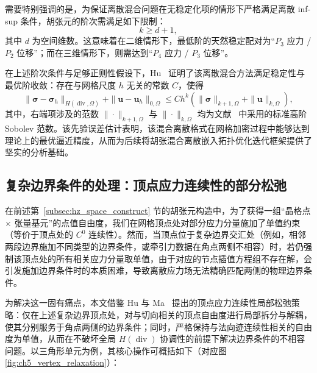 需要特别强调的是，为保证离散混合问题在无稳定化项的情形下严格满足离散 inf-sup 条件，胡张元的阶次需满足如下限制：
\[
k\ge d+1,
\]
其中 $d$ 为空间维数。这意味着在二维情形下，最低阶的天然稳定配对为“$P_3$ 应力 / $P_2$ 位移”；而在三维情形下，则需达到“$P_4$ 应力 / $P_3$ 位移”。

在上述阶次条件与足够正则性假设下，Hu~\cite{huFiniteElementApproximations2015} 证明了该离散混合方法满足稳定性与最优阶收敛：存在与网格尺度 $h$ 无关的常数 $C$，使得
\begin{equation} \label{eq:ch5_hz_error_estimate}
	\|\boldsymbol\sigma - \boldsymbol\sigma_h\|_{H(\operatorname{div},\Omega)} + \|\boldsymbol{u} - \boldsymbol{u}_h\|_{0,\Omega} \le C h^k (\|\boldsymbol\sigma\|_{k+1,\Omega} + \|\boldsymbol{u}\|_{k,\Omega}),
\end{equation}
其中，右端项涉及的范数 $\|\cdot\|_{k+1,\Omega}$ 与 $\|\cdot\|_{k,\Omega}$ 均为文献~\cite{huFiniteElementApproximations2015} 中采用的标准高阶 Sobolev 范数。该先验误差估计表明，该混合离散格式在网格加密过程中能够达到理论上的最优逼近精度，从而为后续将胡张混合离散嵌入拓扑优化迭代框架提供了坚实的分析基础。


\subsection{复杂边界条件的处理：顶点应力连续性的部分松弛}
\label{subsec:vertex_relaxation}

在前述第~\ref{subsec:hz_space_construct} 节的胡张元构造中，为了获得一组“晶格点 $\times$ 张量基元”的点值自由度，我们在网格顶点处对部分应力分量施加了单值约束（等价于顶点处的 $C^0$ 连续性）。然而，当顶点位于复杂边界交汇处（例如，相邻两段边界施加不同类型的边界条件，或牵引力数据在角点两侧不相容）时，若仍强制该顶点处的所有相关应力分量取单值，由于对应的节点插值方程组不存在解，会引发施加边界条件时的本质困难，导致离散应力场无法精确匹配两侧的物理边界条件。

为解决这一固有痛点，本文借鉴 Hu 与 Ma~\cite{huPartialRelaxation02021a} 提出的顶点应力连续性局部松弛策略：仅在上述复杂边界顶点处，对与切向相关的顶点自由度进行局部拆分与解耦，使其分别服务于角点两侧的边界条件；同时，严格保持与法向迹连续性相关的自由度为单值，从而在不破坏全局 $H(\operatorname{div})$ 协调性的前提下解决边界条件的不相容问题。以三角形单元为例，其核心操作可概括如下（对应图 \ref{fig:ch5_vertex_relaxation}）：

